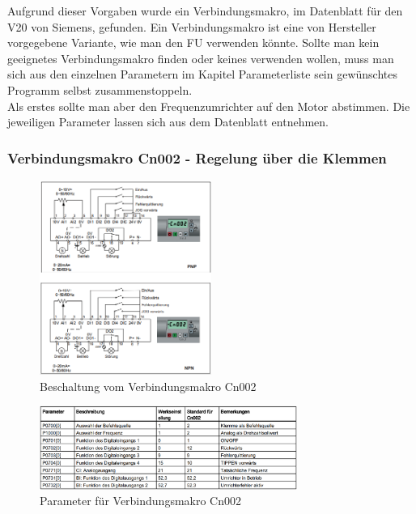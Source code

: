 Aufgrund dieser Vorgaben wurde ein Verbindungsmakro, im Datenblatt für den V20 von Siemens, gefunden. 
Ein Verbindungsmakro ist eine von Hersteller vorgegebene Variante, wie man den \ac{FU} verwenden könnte. Sollte man kein geeignetes Verbindungsmakro finden oder keines verwenden wollen, muss man sich aus den einzelnen Parametern im Kapitel Parameterliste sein gewünschtes Programm selbst zusammenstoppeln. \\
Als erstes sollte man aber den Frequenzumrichter auf den Motor abstimmen. Die jeweiligen Parameter lassen sich aus dem Datenblatt entnehmen. 

\newpage

\subsubsection{Verbindungsmakro Cn002 - Regelung über die Klemmen}
\label{sec:verbindungsmakro}

\begin{figure}[H]
\begin{center}
	\includegraphics[width=0.5\textwidth]{fig/VerbindungsmakroAufbau}
	\caption{Beschaltung vom Verbindungsmakro Cn002 \label{fig:verbindungsmakro}}
\end{center}
\end{figure}

\begin{figure}[H]
\begin{center}
	\includegraphics[width=0.75\textwidth]{fig/VerbindungsmakroParameter}
	\caption{Parameter für Verbindungsmakro Cn002 \label{fig:parameterVerbindungsmakro}}
\end{center}
\end{figure}

